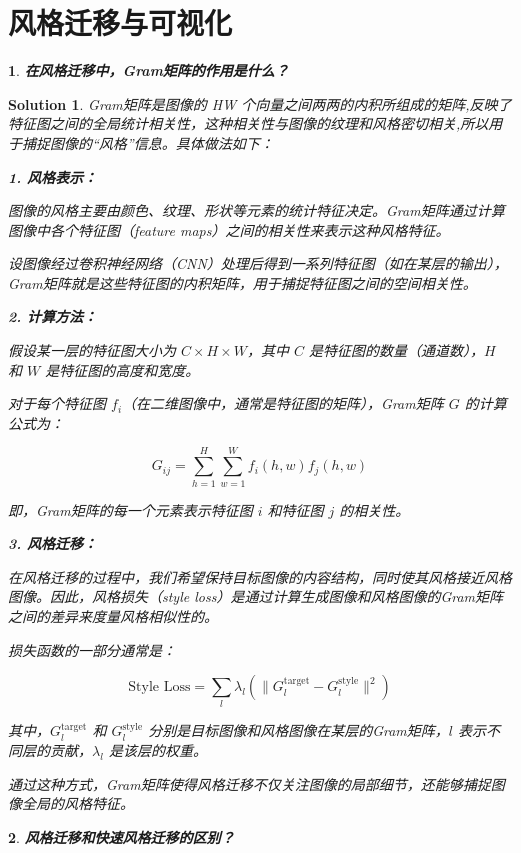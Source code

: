 \documentclass{article}
\theoremstyle{Problem}
\newtheorem{prob}{}
\theoremstyle{Solution}
\newtheorem*{sol}{Solution}
\begin{document}
	\section{风格迁移与可视化}
		
	\begin{prob}
		\textbf{ 在风格迁移中，Gram矩阵的作用是什么？}
	\end{prob}
	
	\begin{sol}
	Gram矩阵是图像的 HW 个向量之间两两的内积所组成的矩阵,反映了特征图之间的全局统计相关性，这种相关性与图像的纹理和风格密切相关,所以用于捕捉图像的“风格”信息。具体做法如下：
	
	\textbf{1. 风格表示：}
	
	图像的风格主要由颜色、纹理、形状等元素的统计特征决定。Gram矩阵通过计算图像中各个特征图（feature maps）之间的相关性来表示这种风格特征。
	
	设图像经过卷积神经网络（CNN）处理后得到一系列特征图（如在某层的输出），Gram矩阵就是这些特征图的内积矩阵，用于捕捉特征图之间的空间相关性。
	
	\textbf{2. 计算方法：}
	
	假设某一层的特征图大小为 \(C \times H \times W\)，其中 \(C\) 是特征图的数量（通道数），\(H\) 和 \(W\) 是特征图的高度和宽度。
	
	对于每个特征图 \(f_i\)（在二维图像中，通常是特征图的矩阵），Gram矩阵 \(G\) 的计算公式为：
	
	\[
	G_{ij} = \sum_{h=1}^{H} \sum_{w=1}^{W} f_i(h, w) f_j(h, w)
	\]
	
	即，Gram矩阵的每一个元素表示特征图 \(i\) 和特征图 \(j\) 的相关性。
	
	\textbf{3. 风格迁移：}
	
	在风格迁移的过程中，我们希望保持目标图像的内容结构，同时使其风格接近风格图像。因此，风格损失（style loss）是通过计算生成图像和风格图像的Gram矩阵之间的差异来度量风格相似性的。
	
	损失函数的一部分通常是：
	
	\[
	\text{Style Loss} = \sum_{l} \lambda_l \left( \| G_l^{\text{target}} - G_l^{\text{style}} \|^2 \right)
	\]
	
	其中，\(G_l^{\text{target}}\) 和 \(G_l^{\text{style}}\) 分别是目标图像和风格图像在某层的Gram矩阵，\(l\) 表示不同层的贡献，\(\lambda_l\) 是该层的权重。
	
	通过这种方式，Gram矩阵使得风格迁移不仅关注图像的局部细节，还能够捕捉图像全局的风格特征。
	\end{sol}
	
	
	\begin{prob}
		\textbf{ 风格迁移和快速风格迁移的区别？}
	\end{prob}
	
\end{document}
